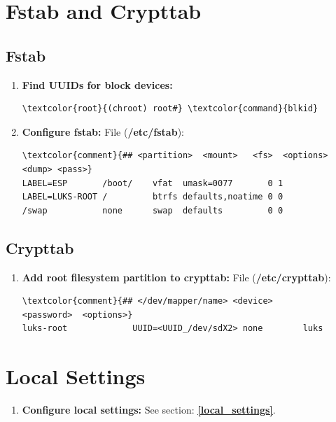 \documentclass[10pt, a4paper, onecolumn, oneside, titlepage, openany]{book}
\begin{document}
\section{Fstab and Crypttab}
\subsection{Fstab}
\begin{enumerate}
    \item \textbf{Find UUIDs for block devices:}
\begin{Verbatim}[commandchars=\\\{\}]
\textcolor{root}{(chroot) root#} \textcolor{command}{blkid}
\end{Verbatim}
    \item \textbf{Configure fstab:}
\newline File (\textbf{\textcolor{file}{/etc/fstab}}):
\begin{Verbatim}[commandchars=\\\{\}]
\textcolor{comment}{## <partition>  <mount>   <fs>  <options>        <dump> <pass>}
LABEL=ESP       /boot/    vfat  umask=0077       0 1
LABEL=LUKS-ROOT /         btrfs defaults,noatime 0 0
/swap           none      swap  defaults         0 0
\end{Verbatim}
\end{enumerate}
\subsection{Crypttab}
\begin{enumerate}
    \item \textbf{Add root filesystem partition to crypttab:}
\newline File (\textbf{\textcolor{file}{/etc/crypttab}}):
\begin{Verbatim}[commandchars=\\\{\}]
\textcolor{comment}{## </dev/mapper/name> <device>              <password>  <options>}
luks-root             UUID=<UUID_/dev/sdX2> none        luks
\end{Verbatim}
\end{enumerate}

\section{Local Settings}
\begin{enumerate}
    \item \textbf{Configure local settings:}
\newline See section: \underline{\textbf{\ref{local_settings}}}.
\end{enumerate}
\end{document}
